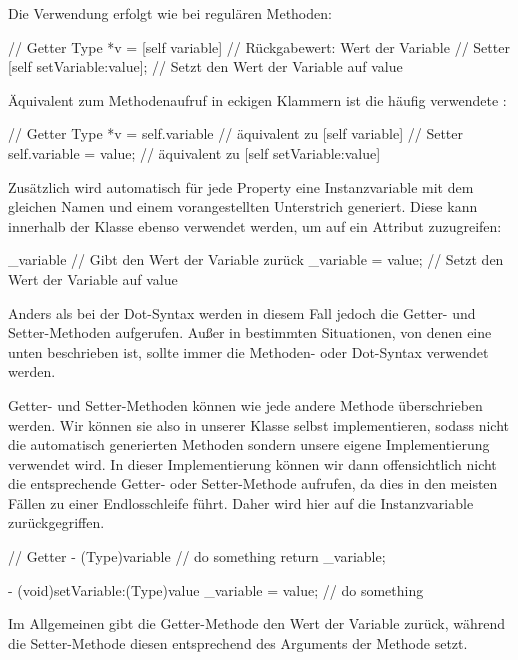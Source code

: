 \documentclass[parskip=half, final]{scrreprt}
\begin{document}
Die Verwendung erfolgt wie bei regulären Methoden:
\begin{objclst}
// Getter
Type *v = [self variable] // Rückgabewert: Wert der Variable
// Setter
[self setVariable:value]; // Setzt den Wert der Variable auf value
\end{objclst}

Äquivalent zum Methodenaufruf in eckigen Klammern ist die häufig verwendete :
\begin{objclst}
// Getter
Type *v = self.variable // äquivalent zu [self variable]
// Setter
self.variable = value; // äquivalent zu [self setVariable:value]
\end{objclst}

Zusätzlich wird automatisch für jede Property eine Instanzvariable mit dem gleichen Namen und einem vorangestellten Unterstrich \objc{_} generiert. Diese kann innerhalb der Klasse ebenso verwendet werden, um auf ein Attribut zuzugreifen:
\begin{objclst}
_variable // Gibt den Wert der Variable zurück
_variable = value; // Setzt den Wert der Variable auf value
\end{objclst}
Anders als bei der Dot-Syntax werden in diesem Fall jedoch  die Getter- und Setter-Methoden aufgerufen. Außer in bestimmten Situationen, von denen eine unten beschrieben ist, sollte immer die Methoden- oder Dot-Syntax verwendet werden.

Getter- und Setter-Methoden können wie jede andere Methode überschrieben werden. Wir können sie also in unserer Klasse selbst implementieren, sodass nicht die automatisch generierten Methoden sondern unsere eigene Implementierung verwendet wird. In dieser Implementierung können wir dann offensichtlich nicht die entsprechende Getter- oder Setter-Methode aufrufen, da dies in den meisten Fällen zu einer Endlosschleife führt. Daher wird hier auf die Instanzvariable zurückgegriffen.

\begin{objclst}
// Getter
- (Type)variable {
    // do something
    return _variable;
}
\end{objclst}

\begin{objclst}
- (void)setVariable:(Type)value {
    _variable = value; 
    // do something
}
\end{objclst}

Im Allgemeinen gibt die Getter-Methode den Wert der Variable zurück, während die Setter-Methode diesen entsprechend des Arguments der Methode setzt.
\end{document}
